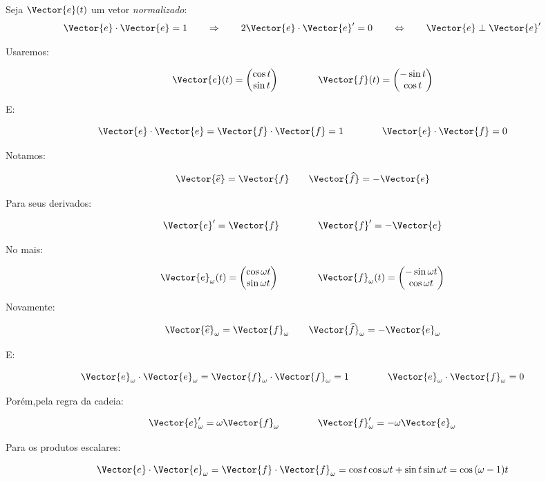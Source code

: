 
Seja $\Vector{e}(t)$ um vetor \emph{normalizado}:
\[
 \Vector{e} \cdot \Vector{e} =1 
 \qquad \Rightarrow\qquad
 2\Vector{e} \cdot \Vector{e}'=0
 \qquad \Leftrightarrow\qquad
 \Vector{e} \perp \Vector{e}'
\]

Usaremos:

\[
 \Vector{e}(t)
 =
 \begin{pmatrix}
  \cos{t}\\\sin{t}
 \end{pmatrix}
  \qquad\qquad
 \Vector{f}(t)
 =
 \begin{pmatrix}
  -\sin{t}\\\cos{t}
 \end{pmatrix}  
\]

E:

\[
 \Vector{e} \cdot \Vector{e}=\Vector{f} \cdot \Vector{f}=1
 \qquad\qquad
  \Vector{e} \cdot \Vector{f}=0
\]

Notamos:

\[
 \Vector{ \widehat{e} } =\Vector{f}
 \qquad
  \Vector{ \widehat{f} } =-\Vector{e}
\]


Para seus derivados:

\[
 \Vector{e}'=\Vector{f}
 \qquad\qquad
 \Vector{f}'=-\Vector{e}
\]

No mais:

\[
 \Vector{e}_\omega(t)
 =
 \begin{pmatrix}
  \cos{\omega t}\\\sin{\omega t}
 \end{pmatrix}
  \qquad\qquad
 \Vector{f}_\omega(t)
 =
 \begin{pmatrix}
  -\sin{\omega t}\\\cos{\omega t}
 \end{pmatrix}  
\]

Novamente:

\[
\qquad
 \Vector{ \widehat{e} }_\omega =\Vector{f}_\omega
 \qquad
 \Vector{ \widehat{f} }_\omega =-\Vector{e}_\omega
 \qquad
\]

E:

\[
 \Vector{e}_\omega \cdot \Vector{e}_\omega=\Vector{f}_\omega \cdot \Vector{f}_\omega=1
 \qquad\qquad
  \Vector{e}_\omega \cdot \Vector{f}_\omega=0
\]

Porém,pela regra da cadeia:

\[
  \Vector{e}_\omega'=\omega\Vector{f}_\omega
 \qquad\qquad
 \Vector{f}_\omega'=-\omega\Vector{e}_\omega
\]

Para os produtos escalares:

\[
 \Vector{e} \cdot \Vector{e}_\omega
 =
 \Vector{f} \cdot \Vector{f}_\omega
 =
 \cos{t}\cos{\omega t}+\sin{t}\sin{\omega t}
 =
 \cos{ (\omega-1) t }
\]
